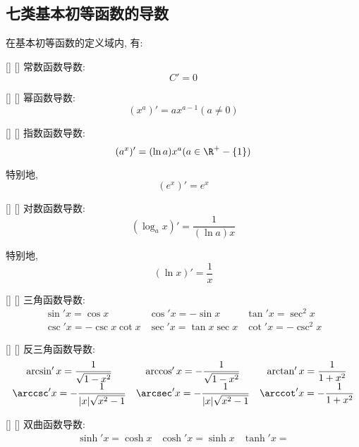 \documentclass[UTF8]{ctexart}
\begin{document}
				
			
		\subsection{七类基本初等函数的导数}
			
			在基本初等函数的定义域内, 有: 
			
			\begin{xmp}
			    []
			    {}
			    []
			    []
				常数函数导数: 
				\[C'=0\]
			\end{xmp}
			
			\begin{xmp}
			    []
			    {}
			    []
			    []
				幂函数导数: 
				\[(x^a)'=ax^{a-1}(a\neq 0)\]
			\end{xmp}
			
			\begin{xmp}
			    []
			    {}
			    []
			    []
				指数函数导数: 
				\[(a^x)'=(\ln a)x^a(a\in\R^+-\{1\})\]
				
				特别地, \[(e^x)'=e^x\]
			\end{xmp}
			
			\begin{xmp}
			    []
			    {}
			    []
			    []
				对数函数导数: 
				\[(\log_ax)'=\frac{1}{(\ln a)x}\]
				
				特别地, 
				\[(\ln x)'=\frac{1}{x}\]
			\end{xmp}
			
			\begin{xmp}
			    []
			    {}
			    []
			    []
				三角函数导数: 
				\[\begin{array}{ccc}
				\sin'x=\cos x & \cos'x=-\sin x & \tan'x=\sec^2x\\
				\csc'x=-\csc x\cot x & \sec'x=\tan x\sec x & \cot'x=-\csc^2x
				\end{array}\]
			\end{xmp}
			
			\begin{xmp}
			    []
			    {}
			    []
			    []
				反三角函数导数: \[\begin{array}{ccc}
				\arcsin'x=\dfrac{1}{\sqrt{1-x^2}} & \arccos'x=-\dfrac{1}{\sqrt{1-x^2}} & \arctan'x=\dfrac{1}{1+x^2}\\
				\arccsc'x=-\dfrac{1}{|x|\sqrt{x^2-1}} & \arcsec'x=-\dfrac{1}{|x|\sqrt{x^2-1}} & \arccot'x=-\dfrac{1}{1+x^2}
				\end{array}\]
			\end{xmp}
			
			\begin{xmp}
			    []
			    {}
			    []
			    []
			 	双曲函数导数: 
				\[\begin{array}{ccc}
			 	\sinh 'x=\cosh x & \cosh'x=\sinh x & \tanh'x=
			 	\end{array}\]
			\end{xmp}
		
\end{document}
